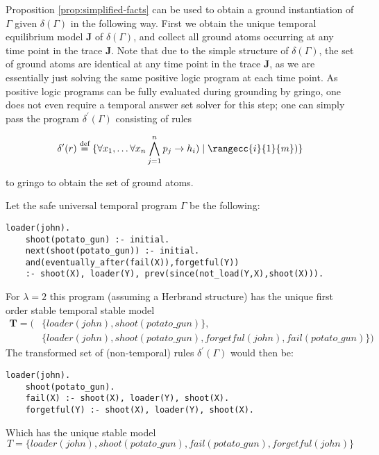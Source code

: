 Proposition \ref{prop:simplified-facts} can be used to obtain a ground
instantiation of $\Gamma$ given $\delta(\Gamma)$ in the following
way. First we obtain the unique temporal equilibrium model $\bm{J}$ of
$\delta(\Gamma)$, and collect all ground atoms occurring at any time
point in the trace $\bm{J}$. Note that due to the simple structure of
$\delta(\Gamma)$, the set of ground atoms are identical at any time
point in the trace $\bm{J}$, as we are essentially just solving the same
positive logic program at each time point. As positive logic programs
can be fully evaluated during grounding by gringo, one does not even
require a temporal answer set solver for this step; one can simply
pass the program $\delta^{\prime}(\Gamma)$ consisting of rules

\begin{equation*} \delta^{\prime}(r) \defeq \{ \forall x_1, \dots \forall x_n
  \bigwedge_{j=1}^{n}p_j \rightarrow h_i) \mid \rangecc{i}{1}{m})\}
\end{equation*}

to gringo to obtain the set of ground atoms.

\begin{example}\label{exam:shoot-nonground-safe}
  Let the safe universal temporal program $\Gamma$ be the following:
  \begin{lstlisting}[language=clingo,numbers=none]
    loader(john).
    shoot(potato_gun) :- initial.
    next(shoot(potato_gun)) :- initial.
    and(eventually_after(fail(X)),forgetful(Y)) 
    :- shoot(X), loader(Y), prev(since(not_load(Y,X),shoot(X))).
  \end{lstlisting}
  For $\lambda=2$ this program (assuming a Herbrand structure) has the
  unique first order stable temporal stable model 
  \begin{align*}
  \bm{T} = (&\{ loader(john), shoot(potato\_gun) \},\\
            &\{ loader(john), shoot(potato\_gun), forgetful(john), fail(potato\_gun) \})
  \end{align*}
  The transformed set of (non-temporal) rules
  $\delta^{\prime}(\Gamma)$ would then be:
  \begin{lstlisting}[language=clingo,numbers=none]
    loader(john).
    shoot(potato_gun).
    fail(X) :- shoot(X), loader(Y), shoot(X).
    forgetful(Y) :- shoot(X), loader(Y), shoot(X).
  \end{lstlisting}
  Which has the unique stable model 
  $$
  T = \{ loader(john), shoot(potato\_gun), fail(potato\_gun), forgetful(john) \}
  $$
\end{example}

